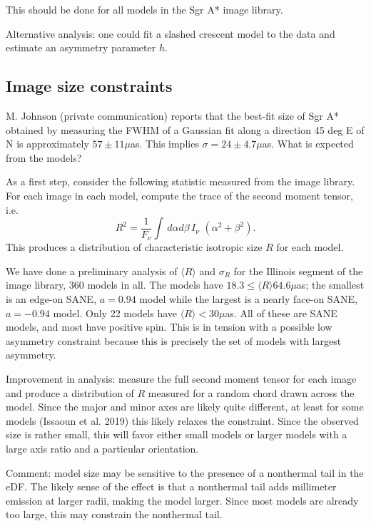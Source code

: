 \documentclass[twocolumn,tighten,dvipsnames]{aastex63}
\newcommand\<{{\langle}}
\renewcommand\>{{\rangle}} %
\begin{document}
This should be done for all models in the Sgr A* image library.

Alternative analysis: one could fit a slashed crescent model to the data and estimate an asymmetry parameter $h$.

\subsection{Image size constraints}

M. Johnson (private communication) reports that the best-fit size of Sgr A* obtained by measuring the FWHM of a Gaussian fit along a direction 45 deg E of N is approximately $57 \pm 11 \mu$as.  This implies $\sigma = 24 \pm 4.7 \mu$as.  What is expected from the models?

As a first step, consider the following statistic measured from the image library.  For each image in each model, compute the trace of the second moment tensor, i.e.
\begin{equation}
    R^2 = \frac{1}{F_\nu} \int \, d\alpha d\beta \, I_\nu \,\, (\alpha^2 + \beta^2).
\end{equation}
This produces a distribution of characteristic isotropic size $R$ for each model.

We have done a preliminary analysis of $\langle R \rangle$ and $\sigma_R$ for the Illinois segment of the image library, 360 models in all.  The models have  $18.3 \le \langle R \rangle 64.6 \mu$as; the smallest is an edge-on SANE, $a = 0.94$ model while the largest is a nearly face-on SANE, $a = -0.94$ model.  Only 22 models have $\langle R \rangle < 30\mu$as.  All of these are SANE models, and most have positive spin.  This is in tension with a possible low  asymmetry constraint because this is precisely the set of models with largest asymmetry.

Improvement in analysis: measure the full second moment tensor for each image and produce a distribution of $R$ measured for a random chord drawn across the model.  Since the major and minor axes are likely quite different, at least for some models (Issaoun et al. 2019) this likely relaxes the constraint.  Since the observed size is rather small, this will favor either small models or larger models with a large axis ratio and a particular orientation.

Comment: model size may be sensitive to the presence of a nonthermal tail in the eDF.  The likely sense of the effect is that a nonthermal tail adds millimeter emission at larger radii, making the model larger.  Since most models are already too large, this may constrain the nonthermal tail.
\end{document}
